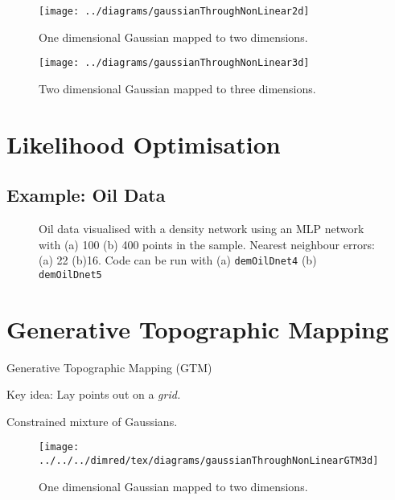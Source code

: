 \begin{figure}
  \centering{}\texttt{[image: ../diagrams/gaussianThroughNonLinear2d]}\caption{One dimensional Gaussian mapped to two dimensions.}

\end{figure}


% 
\begin{figure}
  \centering{}\texttt{[image: ../diagrams/gaussianThroughNonLinear3d]}
  \caption{Two dimensional Gaussian mapped to three dimensions.}

\end{figure}



\section{Likelihood Optimisation}


\subsection{Example: Oil Data}


% 
\begin{figure}
  \begin{centering}
  \end{centering}
  
  \caption{Oil data visualised with a density network using an MLP network with
    (a) 100 (b) 400 points in the sample. Nearest neighbour errors: (a)
    22 (b)16. Code can be run with (a) \texttt{demOilDnet4} (b) \texttt{
      demOilDnet5}}

\end{figure}



\section{Generative Topographic Mapping}


Generative Topographic Mapping (GTM) \cite{Bishop:gtm_ncomp98} 

Key idea: Lay points out on a \emph{grid.}

Constrained mixture of Gaussians.

\begin{figure}


  \begin{center}
    \texttt{[image: ../../../dimred/tex/diagrams/gaussianThroughNonLinearGTM3d]}
  \end{center}
  \caption{One dimensional Gaussian mapped to two dimensions.}
  
\end{figure}



